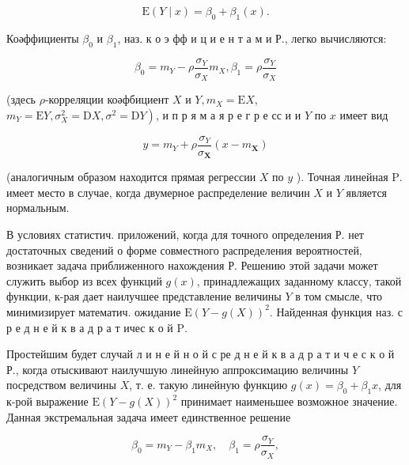 \documentclass[10pt]{article}
\begin{document}
\[

\mathrm{E}(Y \mid x)=\beta_{0}+\beta_{1}(x) .

\]



Коәффициенты $\beta_{0}$ и $\beta_{1}$, наз. к о э фф и ц и е н т а м и Р., легко вычисляются:



\[

\beta_{0}=m_{Y}-\rho \frac{\sigma_{Y}}{\sigma_{X}} m_{X}, \beta_{1}=\rho \frac{\sigma_{Y}}{\sigma_{X}}

\]



(здесь $\rho$-корреляции коәфбициент $X$ и $Y, m_{X}=\mathrm{E} X$, $\left.m_{Y}=\mathrm{E} Y, \sigma_{X}^{2}=\mathrm{D} X, \sigma^{2}=\mathrm{D} Y\right)$, и п р я м а я р е г р е сс и и $Y$ по $x$ имеет вид



\[

y=m_{Y}+\rho \frac{\sigma_{Y}}{\sigma_{\boldsymbol{X}}}\left(x-m_{\boldsymbol{X}}\right)

\]



(аналогичным образом находится прямая регрессии $X$ по $y$ ). Точная линейная $\mathrm{P}$. имеет место в случае, когда двумерное распределение величин $X$ и $Y$ является нормальным.



В условиях статистич. приложений, когда для точного определения Р. нет достаточных сведений о форме совместного распределения вероятностей, возникает задача приближенного нахождения Р. Решению этой задачи может служить выбор из всех функций $g(x)$, принадлежащих заданному классу, такой функции, к-рая дает наилучшее представление величины $Y$ в том смысле, что минимизирует математич. ожидание $\mathrm{E}(Y-g(X))^{2}$. Найденная функция наз. с р е д н е й к в а д р а т ичес к о й $\mathrm{P}$.



Простейшим будет случай л и н е й н о й с ре д н е й к в а д р а т и ч е с к о й Р., когда отыскивают наилучшую линейную аппроксимацию величины $Y$ посредством величины $X$, т. е. такую линейную функцию $g(x)=\beta_{0}+\beta_{1} x$, для к-рой выражение $\mathrm{E}(Y-g(X))^{2}$ принимает наименьшее возможное значение. Данная экстремальная задача имеет единственное решение



\[

\beta_{0}=m_{Y}-\beta_{1} m_{X}, \quad \beta_{1}=\rho \frac{\sigma_{Y}}{\sigma_{X}},

\]
\end{document}

